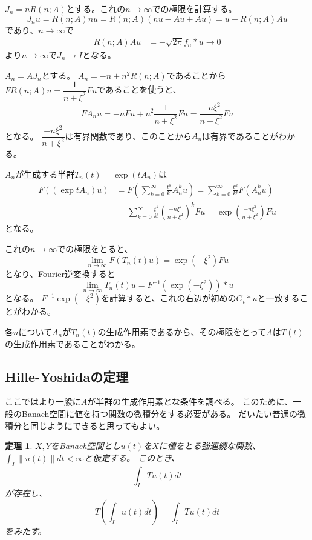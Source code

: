 \documentclass{jsarticle}
\newtheorem{thm}{定理}
\newcommand{\norm}[1]{\|#1\|}
\begin{document}
$J_n=nR(n;A)$とする。これの$n\to \infty$での極限を計算する。
\[
J_nu=R(n;A)nu=R(n;A)(nu-Au+Au)=u+R(n;A)Au
\]
であり、$n\to\infty$で
\begin{align*}
R(n;A)Au&=-\sqrt{2\pi}f_n*u\to0
\end{align*}
より$n\to\infty$で$J_n\to I$となる。

$A_n=AJ_n$とする。
$A_n=-n+n^2R(n;A)$であることから$FR(n;A)u=\dfrac{1}{n+\xi^2}Fu$であることを使うと、
\[
FA_nu=-nFu+n^2\frac{1}{n+\xi^2}Fu=\frac{-n\xi^2}{n+\xi^2}Fu
\]
となる。
$\dfrac{-n\xi^2}{n+\xi^2}$は有界関数であり、このことから$A_n$は有界であることがわかる。

$A_n$が生成する半群$T_n(t)=\exp(tA_n)$は
\begin{align*}
F((\exp tA_n)u)&=F(\sum^\infty_{k=0}\frac{t^k}{k!}A_n^ku)=\sum^\infty_{k=0}\frac{t^k}{k!}F(A_n^ku)\\
&=\sum^\infty_{k=0}\frac{t^k}{k!}(\frac{-n\xi^2}{n+\xi^2})^kFu=\exp(\frac{-n\xi^2}{n+\xi^2})Fu
\end{align*}
となる。

これの$n\to\infty$での極限をとると、
\[
\lim_{n\to\infty}F(T_n(t)u)=\exp(-\xi^2)Fu
\]
となり、Fourier逆変換すると
\[
\lim_{n\to\infty}T_n(t)u=F^{-1}(\exp(-\xi^2))*u
\]
となる。
$F^{-1}\exp(-\xi^2)$を計算すると、これの右辺が初めの$G_t*u$と一致することがわかる。

各$n$について$A_n$が$T_n(t)$の生成作用素であるから、その極限をとって$A$は$T(t)$の生成作用素であることがわかる。

\subsection{Hille-Yoshidaの定理}
ここではより一般に$A$が半群の生成作用素とな条件を調べる。
このために、一般のBanach空間に値を持つ関数の微積分をする必要がある。
だいたい普通の微積分と同じようにできると思ってもよい。

\begin{thm}
$X, Y$をBanach空間とし$u(t)$を$X$に値をとる強連続な関数、$\int_I\norm{u(t)}dt<\infty$と仮定する。
このとき、
\[
\int_ITu(t)dt
\]
が存在し、
\[
T(\int_Iu(t)dt)=\int_ITu(t)dt
\]
をみたす。
\end{thm}
\end{document}
